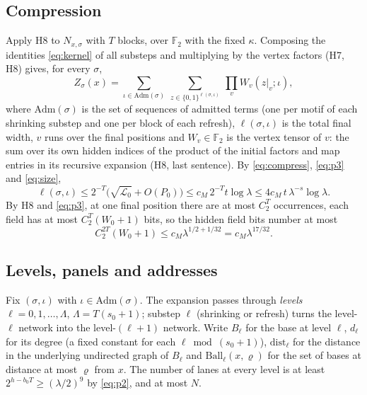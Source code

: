 \documentclass[11pt]{article}
\theoremstyle{definition}
\theoremstyle{remark}
\newcommand{\F}{\mathbb F}
\newcommand{\LL}{\mathcal L}
\newcommand{\Ball}{\mathrm{Ball}}
\begin{document}
\subsection{Compression}\label{subsec:compression}
Apply H8 to $N_{x,\sigma}$ with $T$ blocks, over $\F_2$ with the fixed $\kappa$. Composing the identities \eqref{eq:kernel} of
all substeps and multiplying by the vertex factors (H7, H8) gives, for every $\sigma$,
\begin{equation}\label{eq:expansion}
 Z_\sigma(x)=\sum_{\iota\in\mathrm{Adm}(\sigma)}\ \sum_{z\in\{0,1\}^{\ell(\sigma,\iota)}}\ \prod_{v}W_v(z|_v;\iota),
\end{equation}
where $\mathrm{Adm}(\sigma)$ is the set of sequences of admitted terms (one per motif of each shrinking substep and one per block
of each refresh), $\ell(\sigma,\iota)$ is the total final width, $v$ runs over the final positions and $W_v\in\F_2$ is the
vertex tensor of $v$: the sum over its own hidden indices of the product of the initial factors and map entries in its
recursive expansion (H8, last sentence). By \eqref{eq:compress}, \eqref{eq:p3} and \eqref{eq:size},
\begin{equation}\label{eq:zlen}
 \ell(\sigma,\iota)\le2^{-T}\bigl(\sqrt{\LL_0}+O(P_0)\bigr)\le c_M\,2^{-T}t\log\lambda\le 4c_M\,t\,\lambda^{-s}\log\lambda .
\end{equation}
By H8 and \eqref{eq:p3}, at one final position there are at most $C_2^T$ occurrences, each field has at most
$C_2^T(W_0+1)$ bits, so the hidden field bits number at most
\begin{equation}\label{eq:hidden}
 C_2^{2T}(W_0+1)\le c_M\lambda^{1/2+1/32}=c_M\lambda^{17/32}.
\end{equation}

\subsection{Levels, panels and addresses}\label{subsec:panels}
Fix $(\sigma,\iota)$ with $\iota\in\mathrm{Adm}(\sigma)$. The expansion passes through \emph{levels} $\ell=0,1,\dots,\Lambda$,
$\Lambda=T(s_0+1)$; substep $\ell$ (shrinking or refresh) turns the level-$\ell$ network into the level-$(\ell+1)$ network. Write
$B_\ell$ for the base at level $\ell$, $d_\ell$ for its degree (a fixed constant for each $\ell\bmod(s_0+1)$), $\mathrm{dist}_\ell$
for the distance in the underlying undirected graph of $B_\ell$ and $\Ball_\ell(x,\varrho)$ for the set of bases at distance at most
$\varrho$ from $x$. The number of lanes at every level is at least $2^{h-b_0T}\ge(\lambda/2)^9$ by \eqref{eq:p2}, and at most $N$.
\end{document}

